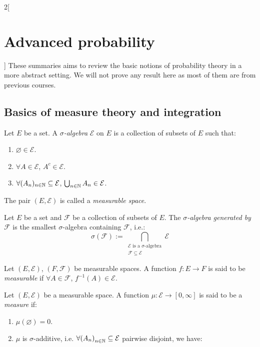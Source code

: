 \documentclass[../../../main_math.tex]{subfiles}
\begin{document}
\begin{multicols}{2}[\section{Advanced probability}]
  These summaries aims to review the basic notions of probability theory in a more abstract setting. We will not prove any result here as most of them are from previous courses.
  \subsection{Basics of measure theory and integration}
  \begin{definition}
    Let $E$ be a set. A \emph{$\sigma$-algebra} $\mathcal{E}$ on $E$ is a collection of subsets of $E$ such that:
    \begin{enumerate}
      \item $\varnothing\in\mathcal{E}$.
      \item $\forall A\in\mathcal{E}$, $A^c\in\mathcal{E}$.
      \item $\forall (A_n)_{n\in\mathbb{N}}\subseteq \mathcal{E}$, $\bigcup_{n\in\mathbb{N}}{A_n}\in\mathcal{E}$.
    \end{enumerate}
    The pair $(E,\mathcal{E})$ is called a \emph{measurable space}.
  \end{definition}
  \begin{definition}
    Let $E$ be a set and $\mathcal{F}$ be a collection of subsets of $E$. The \emph{$\sigma$-algebra generated by $\mathcal{F}$} is the smallest $\sigma$-algebra containing $\mathcal{F}$, i.e.:
    $$
      \sigma(\mathcal{F}):=\bigcap_{\substack{\mathcal{E}\text{ is a }\sigma\text{-algebra}\\\mathcal{F}\subseteq \mathcal{E}}}{\mathcal{E}}
    $$
  \end{definition}
  \begin{definition}
    Let $(E,\mathcal{E})$, $(F,\mathcal{F})$ be measurable spaces. A function $f:E\to F$ is said to be \emph{measurable} if $\forall A\in\mathcal{F}$, $f^{-1}(A)\in\mathcal{E}$.
  \end{definition}
  \begin{definition}[Measure]
    Let $(E,\mathcal{E})$ be a measurable space. A function $\mu:\mathcal{E}\to [0,\infty]$ is said to be a \emph{measure} if:
    \begin{enumerate}
      \item $\mu(\varnothing)=0$.
      \item $\mu$ is $\sigma$-additive, i.e. $\forall {(A_n)}_{n\in\mathbb{N}}\subseteq \mathcal{E}$ pairwise disjoint, we have:

\end{enumerate}
\end{definition}
\end{multicols}
\end{document}
